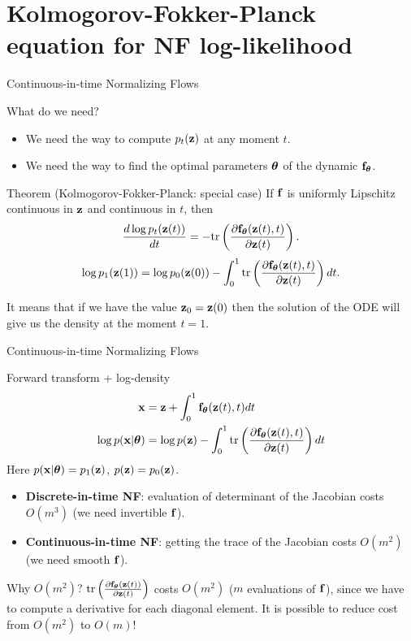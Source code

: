 \section{Kolmogorov-Fokker-Planck equation for NF log-likelihood}
\begin{frame}{Continuous-in-time Normalizing Flows}
	\begin{block}{What do we need?}
		\begin{itemize}
			\item We need the way to compute $p_t(\mathbf{z})$ at any moment $t$.
			\item We need the way to find the optimal parameters $\boldsymbol{\theta}$ of the dynamic $\mathbf{f}_{\boldsymbol{\theta}}$.
		\end{itemize}
	\end{block}
	\vspace{-0.3cm}
	\begin{block}{Theorem (Kolmogorov-Fokker-Planck: special case)}
		If $\mathbf{f}$ is uniformly Lipschitz continuous in $\mathbf{z}$ and continuous in $t$, then
		\[
			\frac{d \log p_t(\mathbf{z}(t))}{d t} = - \text{tr} \left( \frac{\partial \mathbf{f}_{\boldsymbol{\theta}}(\mathbf{z}(t), t)}{\partial \mathbf{z}(t)} \right).
		\]
		\[
			\log p_1(\mathbf{z}(1)) = \log p_0(\mathbf{z}(0)) - \int_{0}^{1} \text{tr}  \left( \frac{\partial \mathbf{f}_{\boldsymbol{\theta}}(\mathbf{z}(t), t)}{\partial \mathbf{z}(t)} \right) dt.
		\]
	\end{block}
	It means that if we have the value $\mathbf{z}_0 = \mathbf{z}(0)$ then the solution of the ODE will give us the density at the moment $t=1$.
\end{frame}
\begin{frame}{Continuous-in-time Normalizing Flows}
	\begin{block}{Forward transform + log-density}
		\vspace{-0.7cm}
		\begin{align*}
				\mathbf{x} &= \mathbf{z} + \int_{0}^{1} \mathbf{f}_{\boldsymbol{\theta}}(\mathbf{z}(t), t) dt \\
				\log p(\mathbf{x} | \boldsymbol{\theta}) &= \log p(\mathbf{z}) - \int_{0}^{1} \text{tr} \left( \frac{\partial \mathbf{f}_{\boldsymbol{\theta}}(\mathbf{z}(t), t)}{\partial \mathbf{z}(t)} \right) dt
		\end{align*}
		Here $p(\mathbf{x} | \boldsymbol{\theta}) = p_1(\mathbf{z})$, $p(\mathbf{z}) = p_0(\mathbf{z})$.
	\end{block}
	\begin{itemize}
		\item \textbf{Discrete-in-time NF}: evaluation of determinant of the Jacobian costs $O(m^3)$ (we need invertible $\mathbf{f}$).
		\item \textbf{Continuous-in-time NF}: getting the trace of the Jacobian costs $O(m^2)$ (we need smooth $\mathbf{f}$).
	\end{itemize}
	\begin{block}{Why $O(m^2)$?}
		$\text{tr} \left( \frac{\partial \mathbf{f}_{\boldsymbol{\theta}}(\mathbf{z}(t))}{\partial \mathbf{z}(t)} \right)$ costs $O(m^2)$ ($m$ evaluations of $\mathbf{f}$), since we have to compute a derivative for each diagonal element. It is possible to reduce cost from $O(m^2)$ to $O(m)$!
	\end{block}
\end{frame}
